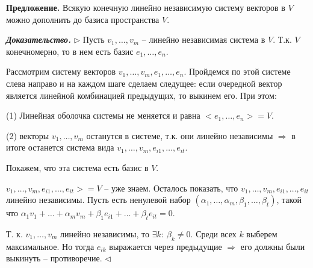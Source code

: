 \vspace{\baselineskip}
\textbf{Предложение.} Всякую конечную линейно независимую систему векторов в $V$ можно дополнить до базиса пространства $V$.

\vspace{\baselineskip}
\textbf{\textit{Доказательство.}} $\rhd$ Пусть $v_1, \dots, v_m$ -- линейно независимая система в $V$. Т.к. $V$ конечномерно, то в нем есть базис $e_1, \dots, e_n$.

Рассмотрим систему векторов $v_1, \dots, v_m, e_1, \dots, e_n$. Пройдемся по этой системе слева направо и на каждом шаге сделаем следущее: если очередной вектор является линейной комбинацией предыдущих, то выкинем его. При этом:

(1) Линейная оболочка системы не меняется и равна $<e_1, \dots, e_n> = V$.

(2) векторы $v_1, \dots, v_m$ останутся в системе, т.к. они линейно независимы $\Rightarrow$ в итоге останется система вида $v_1, \dots, v_m, e_{i1}, \dots, e_{it}$.

Покажем, что эта система есть базис в $V$.

$v_1, \dots, v_m, e_{i1}, \dots, e_{it}> = V$  -- уже знаем. Осталось показать, что $v_1, \dots, v_m, e_{i1}, \dots, e_{it}$ линейно независимы. Пусть есть ненулевой набор $(\alpha_1, \dots, \alpha_m, \beta_1, \dots, \beta_t)$, такой что $\alpha_1 v_1 + \dots + \alpha_m v_m + \beta_1 e_{i1} + \dots + \beta_t e_{it} = 0$.

Т. к. $v_1, \dots, v_m$ линейно независимы, то $\exists k: \ \beta_k \neq 0$. Среди всех $k$ выберем максимальное. Но тогда $e_{ik}$ выражается через предыдущие $\Rightarrow$ его должны были выкинуть -- противоречие. $\lhd$

